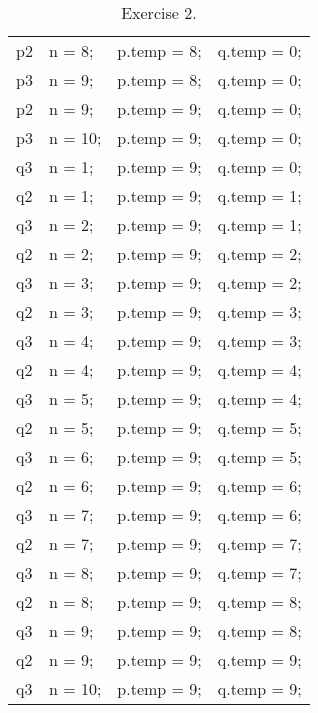 \documentclass[]{article}
\begin{document}
\begin{table}[h]
\begin{tabular}{llll}
p2               & n = 8;           & p.temp = 8;           & q.temp = 0;           \\
p3               & n = 9;           & p.temp = 8;           & q.temp = 0;           \\
p2               & n = 9;           & p.temp = 9;           & q.temp = 0;           \\
p3               & n = 10;          & p.temp = 9;           & q.temp = 0;           \\
q3               & n = 1;           & p.temp = 9;           & q.temp = 0;           \\
q2               & n = 1;           & p.temp = 9;           & q.temp = 1;           \\
q3               & n = 2;           & p.temp = 9;           & q.temp = 1;           \\
q2               & n = 2;           & p.temp = 9;           & q.temp = 2;           \\
q3               & n = 3;           & p.temp = 9;           & q.temp = 2;           \\
q2               & n = 3;           & p.temp = 9;           & q.temp = 3;           \\
q3               & n = 4;           & p.temp = 9;           & q.temp = 3;           \\
q2               & n = 4;           & p.temp = 9;           & q.temp = 4;           \\
q3               & n = 5;           & p.temp = 9;           & q.temp = 4;           \\
q2               & n = 5;           & p.temp = 9;           & q.temp = 5;           \\
q3               & n = 6;           & p.temp = 9;           & q.temp = 5;           \\
q2               & n = 6;           & p.temp = 9;           & q.temp = 6;           \\
q3               & n = 7;           & p.temp = 9;           & q.temp = 6;           \\
q2               & n = 7;           & p.temp = 9;           & q.temp = 7;           \\
q3               & n = 8;           & p.temp = 9;           & q.temp = 7;           \\
q2               & n = 8;           & p.temp = 9;           & q.temp = 8;           \\
q3               & n = 9;           & p.temp = 9;           & q.temp = 8;           \\
q2               & n = 9;           & p.temp = 9;           & q.temp = 9;           \\
q3               & n = 10;          & p.temp = 9;           &q.temp = 9;                      
\end{tabular}
\caption{Exercise 2.}
\end{table}
\end{document}
